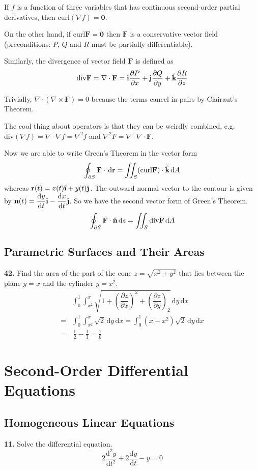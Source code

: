\documentclass[a4paper,12pt]{article}
\newcommand{\ud}{\,\mathrm{d}}
\newcommand{\curl}{\mathrm{curl}}
\newcommand{\del}{\mathrm{div}}
\newcommand{\unit}[1]{\hat{\textbf #1}}
\newcommand{\tho}[3][]{\dfrac{\partial #1 #2}{\partial #3 #1}}
\newcommand{\leibniz}[3][]{\dfrac{\mathrm{d} #1 #2}{\mathrm{d} #3 #1}}
\newcommand{\exercise}[1]{\noindent\textbf{#1.}}
\begin{document}
If $f$ is a function of three variables that has continuous second-order
partial derivatives, then $\curl(\nabla f) = \mathbf 0$.

On the other hand, if $\curl\mathbf F = \mathbf 0$
then $\mathbf F$ is a conservative vector field (preconditions:
$P$, $Q$ and $R$ must be partially differentiable).

Similarly, the divergence of vector field $\mathbf F$ is defined as
\[\del\mathbf{F} = \nabla\cdot\mathbf F
= \unit\i\tho{P}{x} + \unit\j\tho{Q}{y} + \unit k\tho{R}{z}\]

Trivially, $\nabla\cdot(\nabla\times\mathbf F) = 0$
because the terms cancel in pairs by Clairaut's Theorem.

The cool thing about operators is that they can be weirdly combined,
e.g. $\del(\nabla f) = \nabla\cdot\nabla f = \nabla^2 f$
and $\nabla^2 F = \nabla\cdot\nabla\cdot\mathbf F$.

Now we are able to write Green's Theorem in the vector form
\[\oint_{\partial S}\mathbf F\cdot\ud\mathbf r
= \iint_S(\curl\mathbf F)\cdot\unit k\ud A\]
whereas $\mathbf r(t) = x(t)\unit\i + y(t)\unit\j$.
The outward normal vector to the contour is given by
$\mathbf n(t) = \leibniz{y}{t}\unit\i - \leibniz{x}{t}\unit\j$.
So we have the second vector form of Green's Theorem.
\[\oint_{\partial S}\mathbf F\cdot\unit n\ud s = \iint_S\del\mathbf F\ud A\]

\subsection{Parametric Surfaces and Their Areas}
\exercise{42} Find the area of the part of the cone $z = \sqrt{x^2 + y^2}$
that lies between the plane $y = x$ and the cylinder $y = x^2$.
\begin{align*}
  &\int_0^1\int_{x^2}^x\sqrt{
    1 + \left(\tho{z}{x}\right)^2 + \left(\tho{z}{y}\right)_2}\ud y\ud x\\
=&\int_0^1\int_{x^2}^x\sqrt 2\ud y\ud x
= \int_0^1(x - x^2)\sqrt 2\ud y\ud x\\
=&\,\frac{1}{2} - \frac{1}{3}
= \frac{1}{6}
\end{align*}

\section{Second-Order Differential Equations}
\subsection{Homogeneous Linear Equations}
\exercise{11} Solve the differential equation.
\[2\leibniz{^2 y}{t^2} + 2\leibniz{y}{t} - y = 0\]
\end{document}
